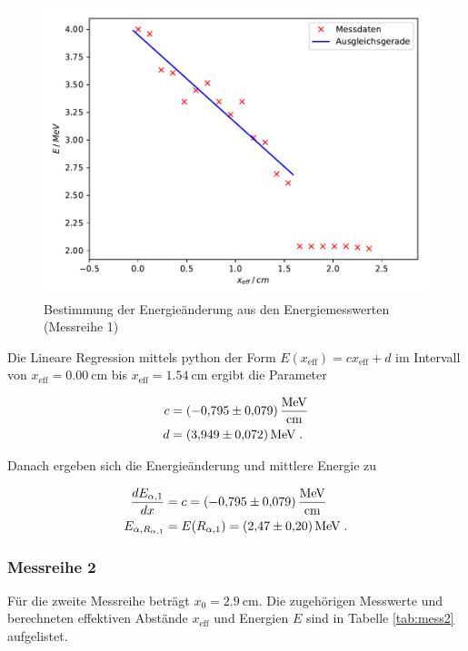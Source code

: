 \begin{figure} [H]
  \centering
  \includegraphics[scale=0.8]{content/plot3.pdf}
  \caption{Bestimmung der Energieänderung aus den Energiemesswerten (Messreihe 1)}
  \label{fig:plot2}
\end{figure}

Die Lineare Regression mittels python der Form $E(x_\text{eff}) = c x_\text{eff} + d$ im Intervall
von $x_\text{eff} = \SI{0.00}{\centi\meter}$ bis $x_\text{eff} = \SI{1.54}{\centi\meter}$
ergibt die Parameter

\begin{align*}
  c &= \SI{- 0.795 +- 0.079}{\mega \eV \per \centi \meter} \\
  d &= \SI{3.949 +- 0.072}{\mega\eV} \; .
\end{align*}

Danach ergeben sich die Energieänderung und mittlere Energie zu

\begin{align*}
  \frac{dE_{\alpha, 1}}{dx} &= c = \SI{-0.795 +- 0.079}{\mega \eV \per \centi \meter} \\
  E_{\alpha, R_{\alpha, 1}} &= E(R_{\alpha, 1}) = \SI{2.47 +- 0.20}{\mega\eV} \; .
\end{align*}


\subsubsection{Messreihe 2} %

Für die zweite Messreihe beträgt $x_0 = \SI{2.9}{\centi\meter}$. Die zugehörigen
Messwerte und berechneten effektiven Abstände $x_\text{eff}$ und Energien $E$ sind in
Tabelle \ref{tab:mess2} aufgelistet.


